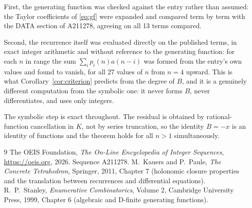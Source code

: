 \documentclass[11pt,a4paper]{article}
\theoremstyle{plain}
\theoremstyle{definition}
\begin{document}
First, the generating function was checked against the entry rather than assumed: the
Taylor coefficients of \eqref{eq:gf} were expanded and compared term by term with the DATA
section of A211278, agreeing on all 13 terms compared.

Second, the recurrence itself was evaluated directly on the published terms, in exact
integer arithmetic and without reference to the generating function: for each $n$ in range
the sum $\sum_{i}p_{i}(n)a(n-i)$ was formed from the entry's own values and found to
vanish, for all 27 values of $n$ from $n=4$ upward. This is what
Corollary~\ref{cor:criterion} predicts from the degree of $B$, and it is a genuinely
different computation from the symbolic one: it never forms $B$, never differentiates, and
uses only integers.

The symbolic step is exact throughout. The residual is obtained by rational-function
cancellation in $K$, not by series truncation, so the identity $B=- x$ is an
identity of functions and the theorem holds for all $n>1$ simultaneously.

\begin{thebibliography}{9}
 The OEIS Foundation, \emph{The On-Line Encyclopedia of Integer Sequences},
\url{https://oeis.org}, 2026. Sequence A211278.
 M.~Kauers and P.~Paule, \emph{The Concrete Tetrahedron}, Springer, 2011,
Chapter 7 (holonomic closure properties and the translation between recurrences and
differential equations).
 R.~P.~Stanley, \emph{Enumerative Combinatorics}, Volume 2, Cambridge
University Press, 1999, Chapter 6 (algebraic and D-finite generating functions).
\end{thebibliography}
\end{document}
